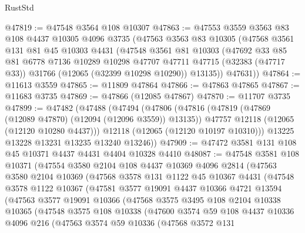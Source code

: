 \begin{lexlean}{RustStd}
\begin{coremodule}
@47819 := @47548 @3564 @108 @10307
@47863 := @47553
    @3559
    @3563
    @83
    @108
    @4437
    @10305
    @4096
    @3735
    (@47563
      @3563
      @83
      @10305
      (@47568
        @3561
        @131
        @81
        @45
        @10303
        @4431
        (@47548
          @3561
          @81
          @10303
          (@47692
            @33
            @85
            @81
            @6778
            @7136
            @10289
            @10298
            @47707
            @47711
            @47715
            (@32383 (@47717 @33))
            @31766
            (@12065 (@32399 @10298 @10290))
            @13135))
        @47631))
@47864 := @11613 @3559
@47865 := @11809 @47864
@47866 := @47863 @47865
@47867 := @11683 @3735
@47869 := @47866 (@12085 @47867)
@47870 := @11707 @3735
@47899 := @47482
    (@47488
      (@47494
        (@47806
          (@47816
            (@47819 (@47869 (@12089 @47870) (@12094 (@12096 @3559)) @13135))
            @47757
            @12118
            (@12065 (@12120 @10280 @4437)))
          @12118
          (@12065 (@12120 @10197 @10310)))
        @13225
        @13228
        @13231
        @13235
        @13240
        @13246))
@47909 := @47472 @3581 @131 @108 @45 @10371 @4437 @4431 @4404 @10328 @4410
@48087 := @47548
    @3581
    @108
    @10371
    (@47554
      @3580
      @2104
      @108
      @4437
      @10369
      @4096
      @2814
      (@47563
        @3580
        @2104
        @10369
        (@47568
          @3578
          @131
          @1122
          @45
          @10367
          @4431
          (@47548
            @3578
            @1122
            @10367
            (@47581
              @3577
              @19091
              @4437
              @10366
              @4721
              @13594
              (@47563
                @3577
                @19091
                @10366
                (@47568
                  @3575
                  @3495
                  @108
                  @2104
                  @10338
                  @10365
                  (@47548
                    @3575
                    @108
                    @10338
                    (@47600
                      @3574
                      @59
                      @108
                      @4437
                      @10336
                      @4096
                      @216
                      (@47563
                        @3574
                        @59
                        @10336
                        (@47568
                          @3572
                          @131

\end{coremodule}
\end{lexlean}
